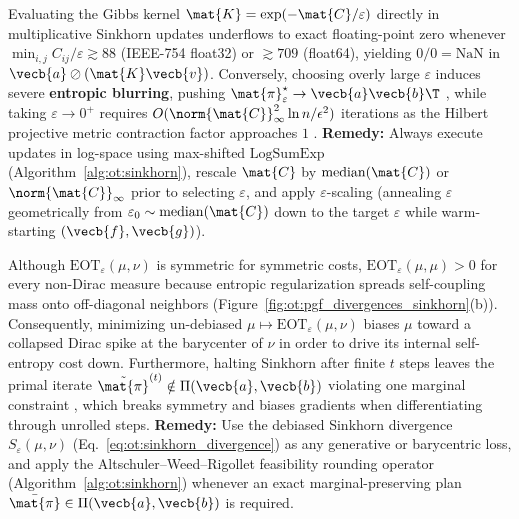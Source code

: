 \documentclass[../../../../master.tex]{subfiles}
\begin{document}
\begin{pitfall}
\label{pit:ot:eps_tradeoff}
Evaluating the Gibbs kernel $\mat{K} = \exp(-\mat{C}/\varepsilon)$ directly in multiplicative Sinkhorn updates underflows to exact floating-point zero whenever $\min_{i,j} C_{ij} / \varepsilon \gtrsim 88$ (IEEE-754 float32) or $\gtrsim 709$ (float64), yielding $0 / 0 = \mathrm{NaN}$ in $\vecb{a} \oslash (\mat{K}\vecb{v})$. Conversely, choosing overly large $\varepsilon$ induces severe \textbf{entropic blurring}, pushing $\mat{\pi}_\varepsilon^\star \to \vecb{a}\vecb{b}\T$ , while taking $\varepsilon \to 0^+$ requires $O(\norm{\mat{C}}_\infty^2 \ln n / \epsilon^2)$ iterations as the Hilbert projective metric contraction factor approaches $1$  .
\textbf{Remedy:} Always execute updates in log-space using max-shifted $\mathrm{LogSumExp}$ (Algorithm~\ref{alg:ot:sinkhorn}), rescale $\mat{C}$ by $\mathrm{median}(\mat{C})$ or $\norm{\mat{C}}_\infty$ prior to selecting $\varepsilon$, and apply $\varepsilon$-scaling (annealing $\varepsilon$ geometrically from $\varepsilon_0 \sim \mathrm{median}(\mat{C})$ down to the target $\varepsilon$ while warm-starting $(\vecb{f}, \vecb{g})$).
\end{pitfall}

\begin{pitfall}
\label{pit:ot:debiasing}
Although $\mathrm{EOT}_\varepsilon(\mu, \nu)$ is symmetric for symmetric costs, $\mathrm{EOT}_\varepsilon(\mu, \mu) > 0$ for every non-Dirac measure because entropic regularization spreads self-coupling mass onto off-diagonal neighbors (Figure~\ref{fig:ot:pgf_divergences_sinkhorn}(b)). Consequently, minimizing un-debiased $\mu \mapsto \mathrm{EOT}_\varepsilon(\mu, \nu)$ biases $\mu$ toward a collapsed Dirac spike at the barycenter of $\nu$ in order to drive its internal self-entropy cost down. Furthermore, halting Sinkhorn after finite $t$ steps leaves the primal iterate $\tilde{\mat{\pi}}^{(t)} \notin \Pi(\vecb{a}, \vecb{b})$ violating one marginal constraint , which breaks symmetry and biases gradients when differentiating through unrolled steps.
\textbf{Remedy:} Use the debiased Sinkhorn divergence $S_\varepsilon(\mu, \nu)$ (Eq.~\eqref{eq:ot:sinkhorn_divergence}) as any generative or barycentric loss, and apply the Altschuler--Weed--Rigollet feasibility rounding operator (Algorithm~\ref{alg:ot:sinkhorn}) whenever an exact marginal-preserving plan $\bar{\mat{\pi}} \in \Pi(\vecb{a}, \vecb{b})$ is required.
\end{pitfall}
\end{document}
